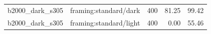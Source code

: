 \begin{longtable}{l>{\raggedright\arraybackslash}p{.42\linewidth}rrr}
b2000\_\allowbreak{}dark\_\allowbreak{}s305 & %
framing:standard/dark & %
400 & %
81.25 & %
99.42 \\ %

b2000\_\allowbreak{}dark\_\allowbreak{}s305 & %
framing:standard/light & %
400 & %
0.00 & %
55.46 \\ %


\end{longtable}
